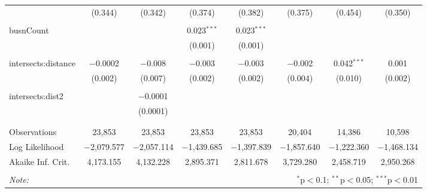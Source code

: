 \begin{table}[!htbp]
\begin{tabular}{@{\extracolsep{-5pt}}lccccccc}
  & (0.344) & (0.342) & (0.374) & (0.382) & (0.375) & (0.454) & (0.350) \\ 
  & & & & & & & \\ 
 busnCount &  &  & 0.023$^{***}$ & 0.023$^{***}$ &  &  &  \\ 
  &  &  & (0.001) & (0.001) &  &  &  \\ 
  & & & & & & & \\ 
 intersects:distance & $-$0.0002 & $-$0.008 & $-$0.003 & $-$0.003 & $-$0.002 & 0.042$^{***}$ & 0.001 \\ 
  & (0.002) & (0.007) & (0.002) & (0.002) & (0.004) & (0.010) & (0.002) \\ 
  & & & & & & & \\ 
 intersects:dist2 &  & $-$0.0001 &  &  &  &  &  \\ 
  &  & (0.0001) &  &  &  &  &  \\ 
  & & & & & & & \\ 
\hline \\[-1.8ex] 
Observations & 23,853 & 23,853 & 23,853 & 23,853 & 20,404 & 14,386 & 10,598 \\ 
Log Likelihood & $-$2,079.577 & $-$2,057.114 & $-$1,439.685 & $-$1,397.839 & $-$1,857.640 & $-$1,222.360 & $-$1,468.134 \\ 
Akaike Inf. Crit. & 4,173.155 & 4,132.228 & 2,895.371 & 2,811.678 & 3,729.280 & 2,458.719 & 2,950.268 \\ 
\hline 
\hline \\[-1.8ex] 
\textit{Note:}  & \multicolumn{7}{r}{$^{*}$p$<$0.1; $^{**}$p$<$0.05; $^{***}$p$<$0.01} \\ 
\end{tabular} 
\end{table} 
